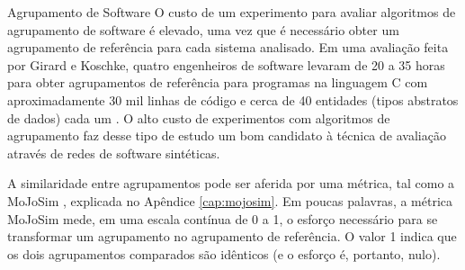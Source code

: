 \begin{section}{Agrupamento de Software}
O custo de um experimento para avaliar algoritmos de agrupamento de software é elevado, uma vez que é necessário obter um agrupamento de referência para cada sistema analisado. Em uma avaliação feita por Girard e Koschke, quatro engenheiros de software levaram de 20 a 35 horas para obter agrupamentos de referência para programas na linguagem C com aproximadamente 30 mil linhas de código e cerca de 40 entidades (tipos abstratos de dados) cada um \cite{Girard2000}. O alto custo de experimentos com algoritmos de agrupamento faz desse tipo de estudo um bom candidato à técnica de avaliação através de redes de software sintéticas.

A similaridade entre agrupamentos pode ser aferida por uma métrica, tal como a MoJoSim \cite{Tzerpos1999,Bittencourt2009}, explicada no Apêndice \ref{cap:mojosim}. Em poucas palavras, a métrica MoJoSim mede, em uma escala contínua de 0 a 1, o esforço necessário para se transformar um agrupamento no agrupamento de referência. O valor 1 indica que os dois agrupamentos comparados são idênticos (e o esforço é, portanto, nulo).


\end{section}

